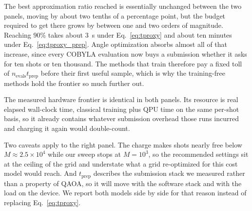 The best approximation ratio reached is essentially unchanged between the two
panels, moving by about two tenths of a percentage point, but the budget
required to get there grows by between one and two orders of magnitude.
Reaching $90\%$ takes about $3$~s under Eq.~\eqref{eq:tproxy} and about ten
minutes under Eq.~\eqref{eq:tproxy_prep}.
Angle optimization absorbs almost all of that increase, since every COBYLA
evaluation now buys a submission whether it asks for ten shots or ten thousand.
The methods that train therefore pay a fixed toll of
$n_{\text{evals}} t_{\text{prep}}$ before their first useful sample, which is
why the training-free methods hold the frontier so much further out.

The measured hardware frontier is identical in both panels.
Its resource is real elapsed wall-clock time, classical training plus QPU time
on the same per-shot basis, so it already contains whatever submission overhead
those runs incurred and charging it again would double-count.

Two caveats apply to the right panel.
The charge makes shots nearly free below $M \approx 2.5 \times 10^4$ while our
sweep stops at $M = 10^3$, so the recommended settings sit at the ceiling of the
grid and understate what a grid re-optimized for this cost model would reach.
And $t_{\text{prep}}$ describes the submission stack we measured rather than a
property of QAOA, so it will move with the software stack and with the load on
the device.
We report both models side by side for that reason instead of replacing
Eq.~\eqref{eq:tproxy}.



